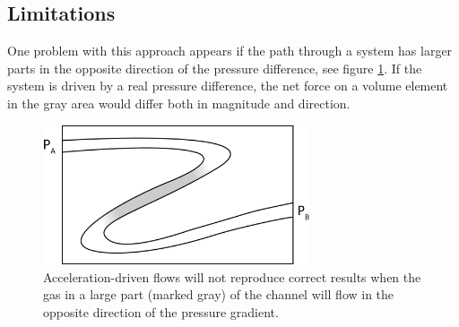 \subsection{Limitations}
One problem with this approach appears if the path through a system has larger parts in the opposite direction of the pressure difference, see figure \ref{fig:gravity_problem}. If the system is driven by a real pressure difference, the net force on a volume element in the gray area would differ both in magnitude and direction.
\begin{figure}[h]
\begin{center}
\includegraphics[width=0.7\textwidth, trim=0cm 0cm 0cm 0cm, clip]{DSMC/figures/gravity_problem.eps}
\end{center}
\caption{Acceleration-driven flows will not reproduce correct results when the gas in a large part (marked gray) of the channel will flow in the opposite direction of the pressure gradient.}
\label{fig:gravity_problem}
\end{figure}

